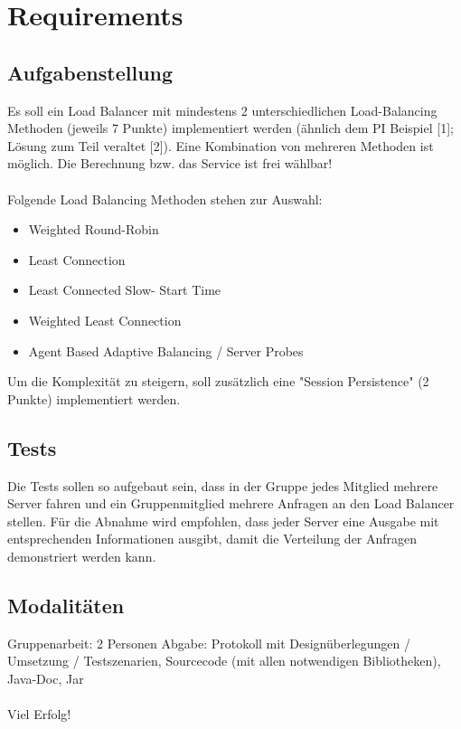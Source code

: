 \documentclass[11pt, a4paper]{article}
\begin{document}
\section{Requirements}

\subsection{Aufgabenstellung}

Es soll ein Load Balancer mit mindestens 2 unterschiedlichen Load-Balancing Methoden (jeweils 7 Punkte) implementiert werden (ähnlich dem PI Beispiel [1]; Lösung zum Teil veraltet [2]). Eine Kombination von mehreren Methoden ist möglich. Die Berechnung bzw. das Service ist frei wählbar!
\\\\
Folgende Load Balancing Methoden stehen zur Auswahl:

\begin{itemize}
	\item Weighted Round-Robin
	\item Least Connection
	\item Least Connected Slow- Start Time
	\item Weighted Least Connection
	\item Agent Based Adaptive Balancing / Server Probes
\end{itemize}

Um die Komplexität zu steigern, soll zusätzlich eine "Session Persistence" (2 Punkte) implementiert werden.

\subsection{Tests}

Die Tests sollen so aufgebaut sein, dass in der Gruppe jedes Mitglied mehrere Server fahren und ein Gruppenmitglied mehrere Anfragen an den Load Balancer stellen. Für die Abnahme wird empfohlen, dass jeder Server eine Ausgabe mit entsprechenden Informationen ausgibt, damit die Verteilung der Anfragen demonstriert werden kann.

\subsection{Modalitäten}

Gruppenarbeit: 2 Personen
Abgabe: Protokoll mit Designüberlegungen / Umsetzung / Testszenarien, Sourcecode (mit allen notwendigen Bibliotheken), Java-Doc, Jar
\\\\
Viel Erfolg!
\end{document}
